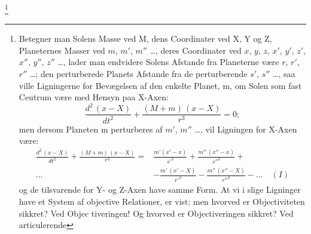 \documentclass[12pt,a4paper]{book}
\begin{document}
\footnote{%
Betegner man Solens Masse ved M, dens Coordinater ved X, Y og Z,
Planeternes Masser ved $m$, $m'$, $m''$ \ldots{}, deres Coordinater
ved $x$, $y$, $z$, $x'$, $y'$, $z'$, $x''$, $y''$, $z''$ \ldots{},
lader man endvidere Solens Afstande fra Planeterne være $r$, $r'$,
$r''$ \ldots; den perturberede Planets Afstande fra de perturberende
$s'$, $s''$ \ldots{}, saa ville Ligningerne for Bevægelsen af den
enkelte Planet, m, om Solen som fast Ceutrum være med Hensyn paa
X-Axen:
\[
\frac{d^{2}\,(x - X)}{dt^{2}} + \frac{(M + m)\,(x - X)}{r^{3}} = 0;
\]
men dersom Planeten m perturberes af $m'$, $m''$ \ldots, vil
Ligningen for X-Axen være:
\begin{align*}
\frac{d^{2}\,(x - X)}{dt^{2}} + \frac{(M + m)\,(x - X)}{r^{3}}
  = {}& \frac{m'(x' - x)}{{s'}^{3}} + \frac{m''\,(x'' - x)}{{s''}^{3}} + \\
\ldots {}& - \frac{m'\,(x' - X)}{{r'}^{3}}
        - \frac{m''\,(x'' - X)}{{r''}^{3}} - \ldots \quad (I)
\end{align*}
og de tilsvarende for Y- og Z-Axen have samme Form. At vi i slige
Ligninger have et System af objective Relationer, er vist; men
hvorved er Objectiviteten sikkret? Ved Objec\-%
tiveringen! Og hvorved er Objectiveringen sikkret? Ved articulerende
}
\end{document}
